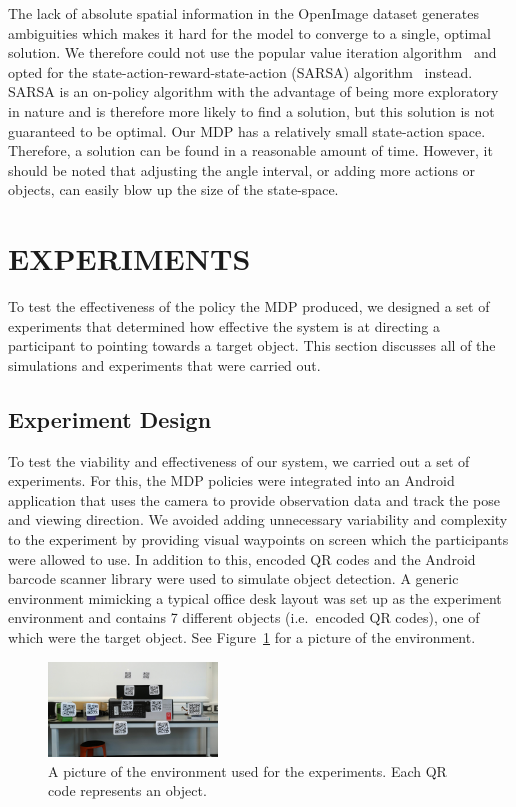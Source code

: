 \documentclass[a4paper, twoside]{article}
\begin{document}
The lack of absolute spatial information in the OpenImage dataset generates ambiguities which makes it hard for the model to converge to a single, optimal solution. We therefore could not use the popular value iteration algorithm~\cite{bellman1957markovian} and opted for the state-action-reward-state-action (SARSA) algorithm~\cite{rummery1994line} instead. SARSA is an on-policy algorithm with the advantage of being more exploratory in nature and is therefore more likely to find a solution, but this solution is not guaranteed to be optimal. Our MDP has a relatively small state-action space. Therefore, a solution can be found in a reasonable amount of time. However, it should be noted that adjusting the angle interval, or adding more actions or objects, can easily blow up the size of the state-space. 

\section{\uppercase{Experiments}}\label{sec:experiments}

\noindent To test the effectiveness of the policy the MDP produced, we designed a set of experiments that determined how effective the system is at directing a participant to pointing towards a target object. This section discusses all of the simulations and experiments that were carried out. 

\subsection{Experiment Design}

\noindent To test the viability and effectiveness of our system, we carried out a set of experiments. For this, the MDP policies were integrated into an Android application that uses the camera to provide observation data and track the pose and viewing direction. We avoided adding unnecessary variability and complexity to the experiment by providing visual waypoints on screen which the participants were allowed to use. In addition to this, encoded QR codes and the Android barcode scanner library were used to simulate object detection. A generic environment mimicking a typical office desk layout was set up as the experiment environment and contains 7 different objects (i.e.\ encoded QR codes), one of which were the target object. See Figure~\ref{fig:env-picture} for a picture of the environment. 

\begin{figure}
  \centering
  \includegraphics[width=0.4\textwidth]{figures/test_env_picture.jpg}
  \caption{A picture of the environment used for the experiments. Each QR code represents an object. }\label{fig:env-picture}
\end{figure}
\end{document}
